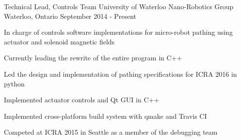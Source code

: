 \begin{cventries}

\cventry
{Technical Lead, Controls Team}
{University of Waterloo Nano-Robotics Group}
{Waterloo, Ontario}
{September 2014 - Present} %
{ %
In charge of controls software implementations for micro-robot pathing using actuator and solenoid magnetic fields
\begin{cvitems}
\item[]
\item {Currently leading the rewrite of the entire program in C++}
\item {Led the design and implementation of pathing specifications for ICRA 2016 in python}
\item {Implemented actuator controls and Qt GUI in C++}
\item {Implemented cross-platform build system with qmake and Travis CI}
\item {Competed at ICRA 2015 in Seattle as a member of the debugging team}
\end{cvitems} 
}


\end{cventries}

